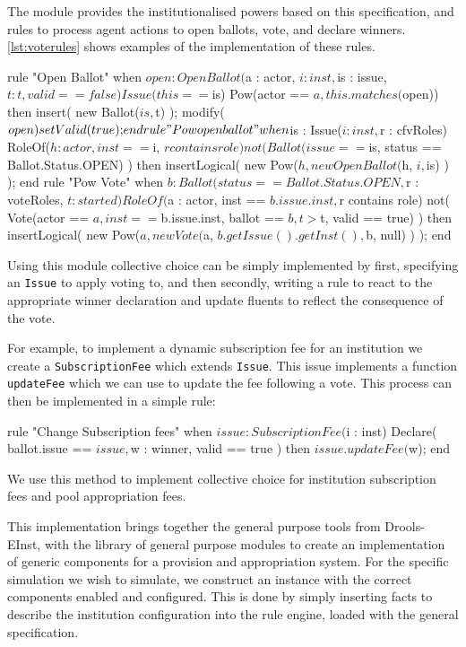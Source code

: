 The module provides the institutionalised powers based on this specification,
and rules to process agent actions to open ballots, vote, and declare winners.
\autoref{lst:voterules} shows examples of the implementation of these rules.

\begin{drools}[label=lst:voterules,caption={Opening of ballots and voting.}]
rule "Open Ballot"
	when
		$open : OpenBallot($a : actor, $i : inst, $is : issue, $t: t, valid == false)
		Issue(this == $is)
		Pow(actor == $a, this.matches($open))
	then
		insert( new Ballot($is, $t) );
		modify($open) {
			setValid(true);
		}
end
rule "Pow open ballot"
	when
		$is : Issue($i : inst, $r : cfvRoles)
		RoleOf($h : actor, inst == $i, $r contains role)
		not( Ballot(issue == $is, status == Ballot.Status.OPEN) )
	then
		insertLogical( new Pow($h, new OpenBallot($h, $i, $is) ) );
end
rule "Pow Vote"
	when
		$b : Ballot(status == Ballot.Status.OPEN, $r : voteRoles, $t : started)
		RoleOf($a : actor, inst == $b.issue.inst, $r contains role)
		not( Vote(actor == $a, inst == $b.issue.inst, ballot == $b, t > $t, valid == true) )
	then
		insertLogical( new Pow($a, new Vote($a, $b.getIssue().getInst(), $b, null) ) );
end
\end{drools}

Using this module collective choice can be simply implemented by first,
specifying an \texttt{Issue} to apply voting to, and then secondly, writing a
rule to react to the appropriate winner declaration and update fluents to
reflect the consequence of the vote.

For example, to implement a dynamic subscription fee for an institution we
create a \texttt{SubscriptionFee} which extends \texttt{Issue}. This issue
implements a function \texttt{updateFee} which we can use to update the fee
following a vote. This process can then be implemented in a simple rule:

\begin{droolsinline}
rule "Change Subscription fees"
	when
		$issue : SubscriptionFee($i : inst)
		Declare( ballot.issue == $issue, $w : winner, valid == true )
	then
		$issue.updateFee($w);
end
\end{droolsinline}

We use this method to implement collective choice for institution subscription
fees and pool appropriation fees.


This implementation brings together the general purpose tools from Drools-
EInst, with the library of general purpose modules to create an implementation
of generic components for a provision and appropriation system. For the
specific simulation we wish to simulate, we construct an instance with the
correct components enabled and configured. This is done by simply inserting facts to describe the institution configuration into the rule engine, loaded with the general
specification.

